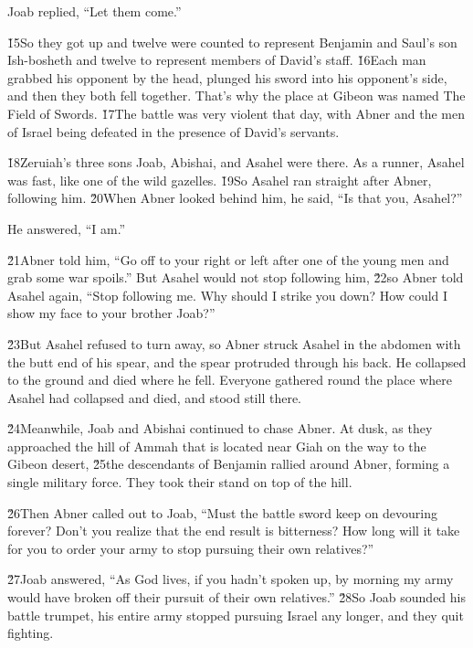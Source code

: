 Joab replied, ``Let them come.''

\v{15}So they got up and twelve were counted to represent Benjamin and Saul's son Ish-bosheth and twelve to represent members of David's staff. \v{16}Each man grabbed his opponent by the head, plunged his sword into his opponent's side, and then they both fell together. That's why the place at Gibeon was named The Field of Swords. \v{17}The battle was very violent that day, with Abner and the men of Israel being defeated in the presence of David's servants.

\v{18}Zeruiah's three sons Joab, Abishai, and Asahel were there. As a runner, Asahel was fast, like one of the wild gazelles. \v{19}So Asahel ran straight after Abner, following him. \v{20}When Abner looked behind him, he said, ``Is that you, Asahel?''

He answered, ``I am.''

\v{21}Abner told him, ``Go off to your right or left after one of the young men and grab some war spoils.'' But Asahel would not stop following him, \v{22}so Abner told Asahel again, ``Stop following me. Why should I strike you down? How could I show my face to your brother Joab?''

\v{23}But Asahel refused to turn away, so Abner struck Asahel in the abdomen with the butt end of his spear, and the spear protruded through his back. He collapsed to the ground and died where he fell. Everyone gathered round the place where Asahel had collapsed and died, and stood still there.

\v{24}Meanwhile, Joab and Abishai continued to chase Abner. At dusk, as they approached the hill of Ammah that is located near Giah on the way to the Gibeon desert, \v{25}the descendants of Benjamin rallied around Abner, forming a single military force. They took their stand on top of the hill.

\v{26}Then Abner called out to Joab, ``Must the battle sword keep on devouring forever? Don't you realize that the end result is bitterness? How long will it take for you to order your army to stop pursuing their own relatives?''

\v{27}Joab answered, ``As God lives, if you hadn't spoken up, by morning my army would have broken off their pursuit of their own relatives.'' \v{28}So Joab sounded his battle trumpet, his entire army stopped pursuing Israel any longer, and they quit fighting.

